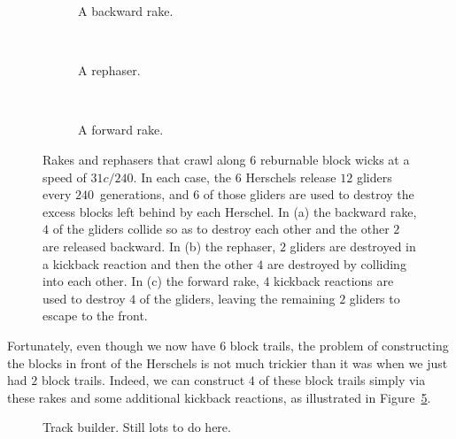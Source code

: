 \begin{figure}[!htb]
	\centering
	\begin{subfigure}{0.28\textwidth}
		\centering
		\caption{A backward rake.}\label{fig:31c_240_back_rake}
	\end{subfigure} \ \ \begin{subfigure}{0.28\textwidth}
		\centering
		\caption{A rephaser.}\label{fig:31c_240_rephaser}
	\end{subfigure} \ \ \begin{subfigure}{0.4\textwidth}
		\centering
		\caption{A forward rake.}\label{fig:31c_240_forward_rake}
	\end{subfigure}
	\caption{Rakes and rephasers that crawl along $6$ reburnable block wicks at a speed of $31c/240$. In each case, the $6$ Herschels release $12$ gliders every $240$~generations, and $6$ of those gliders are used to destroy the excess blocks left behind by each Herschel. In (a) the backward rake, $4$ of the gliders collide so as to destroy each other and the other $2$ are released backward. In (b) the rephaser, $2$ gliders are destroyed in a kickback reaction and then the other $4$ are destroyed by colliding into each other. In (c) the forward rake, $4$ kickback reactions are used to destroy $4$ of the gliders, leaving the remaining $2$ gliders to escape to the front.}\label{fig:31c_240_rakes_and_rephaser}
\end{figure}

Fortunately, even though we now have $6$ block trails, the problem of constructing the blocks in front of the Herschels is not much trickier than it was when we just had $2$ block trails. Indeed, we can construct $4$ of these block trails simply via these rakes and some additional kickback reactions, as illustrated in Figure~\ref{fig:31c_240_track_builder}.

\begin{figure}[!htb]
	\centering
	\caption{Track builder. Still lots to do here.}\label{fig:31c_240_track_builder}
\end{figure}

